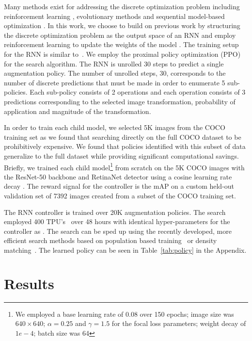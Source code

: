 \documentclass[10pt,twocolumn,letterpaper]{article}
\begin{document}
Many methods exist for addressing the discrete optimization problem including reinforcement learning \cite{zoph2016neural}, evolutionary methods \cite{real2018regularized} and sequential model-based optimization \cite{liu2017progressive}. In this work, we choose to build on previous work by structuring the discrete optimization problem as the output space of an RNN and employ reinforcement learning to update the weights of the model \cite{zoph2016neural}. The training setup for the RNN is similar to~\cite{zoph2016neural,zoph2017learning, cubuk2017intriguing, cubuk2018autoaugment}. We employ the proximal policy optimization (PPO) \cite{schulman2017proximal} for the search algorithm. The RNN is unrolled 30 steps to predict a single augmentation policy. The number of unrolled steps, 30,  corresponds to the number of discrete predictions that must be made in order to enumerate 5 sub-policies. Each sub-policy consists of 2 operations and each operation consists of 3 predictions corresponding to the selected image transformation, probability of application and magnitude of the transformation.



In order to train each child model, we selected 5K images from the COCO training set as we found that searching directly on the full COCO dataset to be prohibitively expensive. We found that policies identified with this subset of data generalize to the full dataset while providing significant computational savings. Briefly, we trained each child model\footnote{We employed a base learning rate of 0.08 over 150 epochs; image size was $640 \times 640$; $\alpha=0.25$ and $\gamma=1.5$ for the focal loss parameters; weight decay of $1e-4$; batch size was 64} from scratch on the 5K COCO images with the ResNet-50 backbone \cite{he2016deep} and RetinaNet detector \cite{lin2017focal} using a cosine learning rate decay \cite{cosine}.
The reward signal for the controller is the mAP on a custom held-out validation set of 7392 images created from a subset of the COCO training set.

The RNN controller is trained over 20K augmentation policies. The search employed 400 TPU's~\cite{jouppi2017datacenter} over 48 hours with identical hyper-parameters for the controller as \cite{zoph2017learning}. The search can be sped up using the recently developed, more efficient search methods based on population based training~\cite{ho2019population} or density matching~\cite{lim2019fast}. The learned policy can be seen in Table~\ref{tab:policy} in the Appendix. 
\section{Results}
\label{sec:results}
\end{document}
